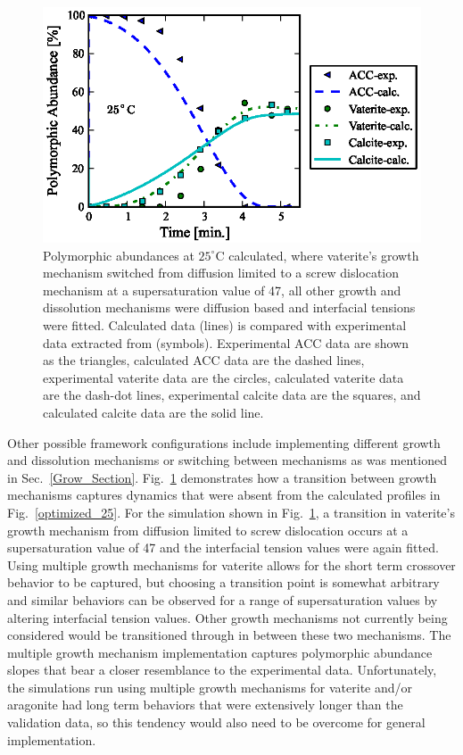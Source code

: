 \documentclass[preprint,3p,a4paper,times,12pt,authoryear]{elsarticle}
\begin{document}
\begin{figure}[!htbp]
\begin{center}
\includegraphics{fig_7_dual_growth_mechanism}
\end{center}
\caption{Polymorphic abundances at $25^\circ$C calculated, where vaterite's growth mechanism switched from diffusion limited to a screw dislocation mechanism at a supersaturation value of 47, all other growth and dissolution mechanisms were diffusion based and interfacial tensions were fitted.  Calculated data (lines) is compared with experimental data extracted from \citep{Ogino1987} (symbols).  Experimental ACC data are shown as the triangles, calculated ACC data are the dashed lines, experimental vaterite data are the circles, calculated vaterite data are the dash-dot lines, experimental calcite data are the squares, and calculated calcite data are the solid line.}
\label{alt_grow}
\end{figure}

Other possible framework configurations include implementing different growth and dissolution mechanisms or switching between mechanisms as was mentioned in Sec.~\ref{Grow_Section}.  Fig.~\ref{alt_grow} demonstrates how a transition between growth mechanisms captures dynamics that were absent from the calculated profiles in Fig.~\ref{optimized_25}.  For the simulation shown in Fig.~\ref{alt_grow}, a transition in vaterite's growth mechanism from diffusion limited to screw dislocation occurs at a supersaturation value of 47 and the interfacial tension values were again fitted.  Using multiple growth mechanisms for vaterite allows for the short term crossover behavior to be captured, but choosing a transition point is somewhat arbitrary and similar behaviors can be observed for a range of supersaturation values by altering interfacial tension values.  Other growth mechanisms not currently being considered would be transitioned through in between these two mechanisms.  The multiple growth mechanism implementation captures polymorphic abundance slopes that bear a closer resemblance to the experimental data.  Unfortunately, the simulations run using multiple growth mechanisms for vaterite and/or aragonite had long term behaviors that were extensively longer than the validation data, so this tendency would also need to be overcome for general implementation.  
\end{document}
